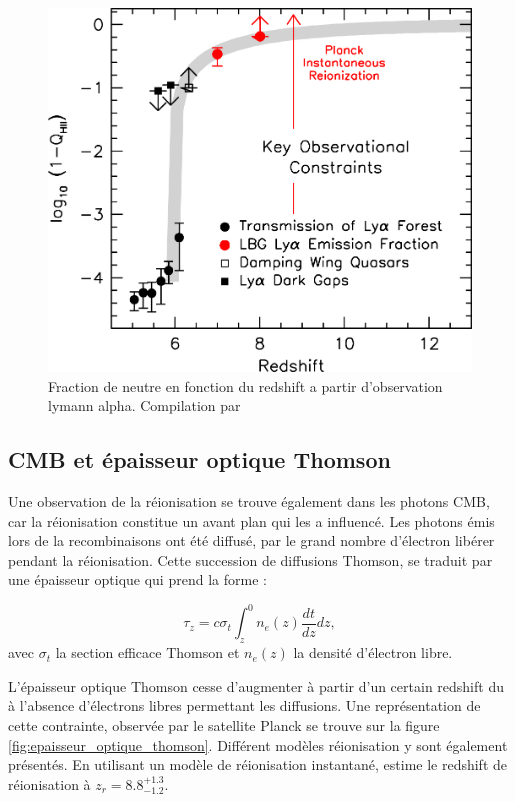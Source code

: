\begin{figure}
        \includegraphics[width=.95\linewidth]{img/01/xionconstrains.jpg} 
        \caption[Fraction de neutre]{Fraction de neutre en fonction du redshift a partir d'observation lymann alpha.
        Compilation par \cite{2015ApJ...811..140B}}
 		\label{fig:compile_constrains}
\end{figure}


\subsection{CMB et épaisseur optique Thomson}

Une observation de la réionisation se trouve également dans les photons CMB, car la réionisation constitue un avant plan qui les a influencé. 
Les photons émis lors de la recombinaisons ont été diffusé, par le grand nombre d'électron libérer pendant la réionisation.
Cette succession de diffusions Thomson, se traduit par une épaisseur optique qui prend la forme : 

\begin{equation}
\tau_z = c \sigma_t \int_z^0 n_e (z) \frac{dt}{dz} dz,
\end{equation}
avec $\sigma_t$ la section efficace Thomson et $n_e (z)$ la densité d'électron libre.

L'épaisseur optique Thomson cesse d'augmenter à partir d'un certain redshift du à l’absence d'électrons libres permettant les diffusions.
Une représentation de cette contrainte, observée par le satellite Planck se trouve sur la figure \ref{fig:epaisseur_optique_thomson}.
Différent modèles réionisation y sont également présentés.
En utilisant un modèle de réionisation instantané, \cite{planck_collaboration_planck_2016} estime le redshift de réionisation à $z_r = 8.8 ^{+1.3}_{-1.2}$.


